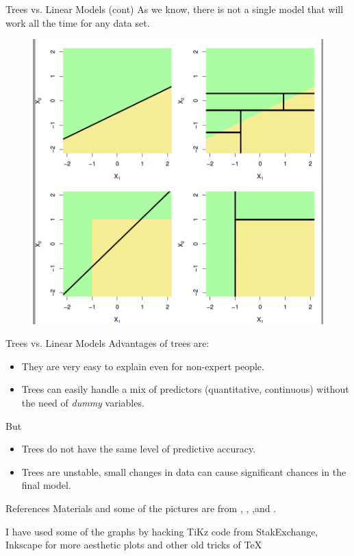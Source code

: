 \documentclass{beamer}
\begin{document}
\begin{frame}{Trees vs. Linear Models (cont)}
	As we know, there is not a single model that will work all the time for any data set. 
	\begin{figure}[h]
	\centering
	\includegraphics[scale=0.4]{../../Figures/fig_trees_vs_ols.png}
\end{figure}	
\end{frame}

\begin{frame}{Trees vs. Linear Models}
	Advantages of trees are:
	\begin{itemize}
		\item They are very easy to explain even for non-expert people.
		\item Trees can easily handle a mix of predictors (quantitative, continuous) without the need of {\it dummy} variables.
	\end{itemize}
But 
\begin{itemize}
	\item Trees do not have the same level of predictive accuracy.
	\item Trees are unstable, small changes in data can cause significant chances in the final model.
\end{itemize}
\end{frame}

\begin{frame}{References}
	Materials and some of the pictures are from \citep{James2015}, \citep{genuer}, \citep{cartbook},and \citep{geron2}.
	\printbibliography 	
	
	I have used some of the graphs by hacking TiKz code from StakExchange, Inkscape for more aesthetic plots and other old tricks of \TeX
	
\end{frame}
\end{document}
